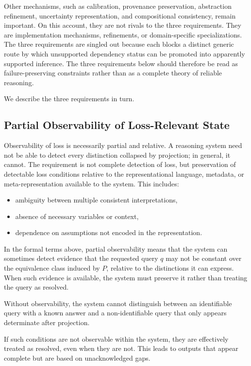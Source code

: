 \documentclass[11pt]{article}
\begin{document}
Other mechanisms, such as calibration, provenance preservation, abstraction refinement, uncertainty representation, and compositional consistency, remain important. On this account, they are not rivals to the three requirements. They are implementation mechanisms, refinements, or domain-specific specializations. The three requirements are singled out because each blocks a distinct generic route by which unsupported dependency status can be promoted into apparently supported inference. The three requirements below should therefore be read as failure-preserving constraints rather than as a complete theory of reliable reasoning.

We describe the three requirements in turn.

\subsection{Partial Observability of Loss-Relevant State}

Observability of loss is necessarily partial and relative. A reasoning system need not be able to detect every distinction collapsed by projection; in general, it cannot. The requirement is not complete detection of loss, but preservation of detectable loss conditions relative to the representational language, metadata, or meta-representation available to the system. This includes:

\begin{itemize}[leftmargin=1.5em]
    \item ambiguity between multiple consistent interpretations,
    \item absence of necessary variables or context,
    \item dependence on assumptions not encoded in the representation.
\end{itemize}

In the formal terms above, partial observability means that the system can sometimes detect evidence that the requested query $q$ may not be constant over the equivalence class induced by $P$, relative to the distinctions it can express. When such evidence is available, the system must preserve it rather than treating the query as resolved.

Without observability, the system cannot distinguish between an identifiable query with a known answer and a non-identifiable query that only appears determinate after projection.

If such conditions are not observable within the system, they are effectively treated as resolved, even when they are not. This leads to outputs that appear complete but are based on unacknowledged gaps.
\end{document}
